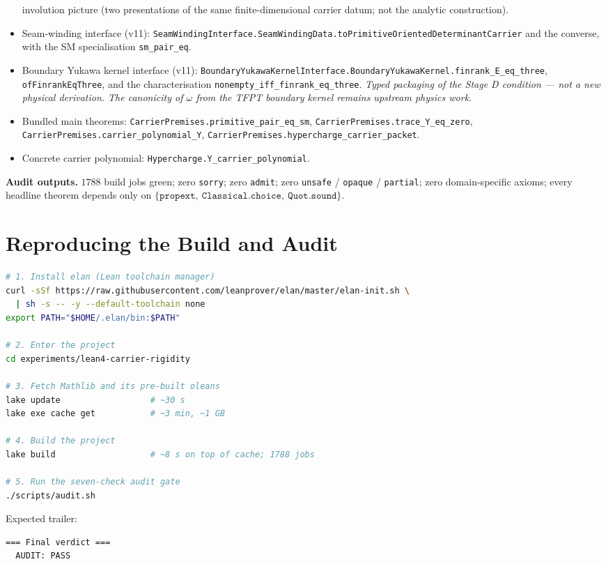 \begin{tfptexports}
\begin{itemize}[leftmargin=1.5em, itemsep=0pt]
  involution picture (two presentations of the same
  finite-dimensional carrier datum; not the analytic
  construction).
\item Seam-winding interface (v11):
  \texttt{SeamWindingInterface.SeamWindingData.toPrimitiveOrientedDeterminantCarrier}
  and the converse, with the SM specialisation
  \texttt{sm\_pair\_eq}.
\item Boundary Yukawa kernel interface (v11):
  \texttt{BoundaryYukawaKernelInterface.BoundaryYukawaKernel.finrank\_E\_eq\_three},
  \texttt{ofFinrankEqThree}, and the characterisation
  \texttt{nonempty\_iff\_finrank\_eq\_three}. \emph{Typed
  packaging of the Stage D condition --- not a new physical
  derivation. The canonicity of $\omega$ from the TFPT
  boundary kernel remains upstream physics work.}
\item Bundled main theorems:
  \texttt{CarrierPremises.primitive\_pair\_eq\_sm},
  \texttt{CarrierPremises.trace\_Y\_eq\_zero},
  \texttt{CarrierPremises.carrier\_polynomial\_Y},
  \texttt{CarrierPremises.hypercharge\_carrier\_packet}.
\item Concrete carrier polynomial:
  \texttt{Hypercharge.Y\_carrier\_polynomial}.
\end{itemize}

\textbf{Audit outputs.}
$1788$ build jobs green; zero \texttt{sorry}; zero
\texttt{admit}; zero \texttt{unsafe} / \texttt{opaque} /
\texttt{partial}; zero domain-specific axioms; every headline
theorem depends only on
$\{\texttt{propext},\ \texttt{Classical.choice},\ \texttt{Quot.sound}\}$.
\end{tfptexports}

\appendix
\section{Reproducing the Build and Audit}

\begin{lstlisting}[language=bash]
# 1. Install elan (Lean toolchain manager)
curl -sSf https://raw.githubusercontent.com/leanprover/elan/master/elan-init.sh \
  | sh -s -- -y --default-toolchain none
export PATH="$HOME/.elan/bin:$PATH"

# 2. Enter the project
cd experiments/lean4-carrier-rigidity

# 3. Fetch Mathlib and its pre-built oleans
lake update                  # ~30 s
lake exe cache get           # ~3 min, ~1 GB

# 4. Build the project
lake build                   # ~8 s on top of cache; 1788 jobs

# 5. Run the seven-check audit gate
./scripts/audit.sh
\end{lstlisting}

Expected trailer:

\begin{lstlisting}
=== Final verdict ===
  AUDIT: PASS
\end{lstlisting}


